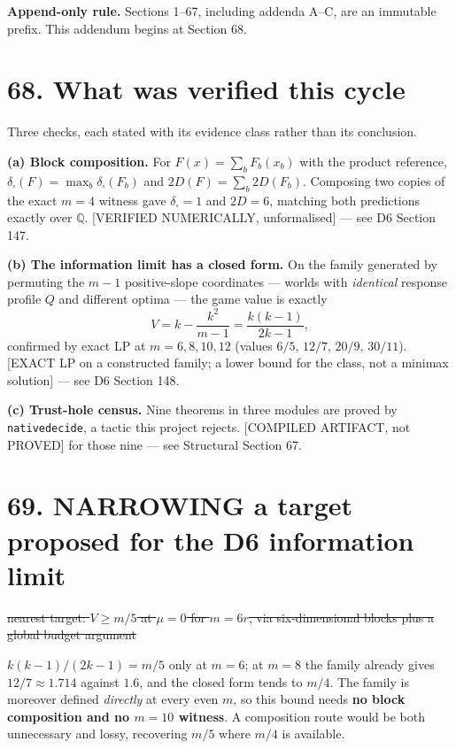 \documentclass[9pt,twocolumn]{article}
\newcommand{\oldclaim}[1]{\sout{#1}}
\newcommand{\eclass}[1]{\textsf{[#1]}}
\renewcommand{\_}{\CIGunderscore\allowbreak}
\begin{document}
\sloppy
{}
\textbf{Append-only rule.} Sections 1--67, including addenda A--C, are an immutable prefix. This addendum begins at Section 68.

\section*{68. What was verified this cycle}
Three checks, each stated with its evidence class rather than its conclusion.

\textbf{(a) Block composition.} For $F(x)=\sum_b F_b(x_b)$ with the product reference, $\delta_\square(F)=\max_b\delta_\square(F_b)$ and $2D(F)=\sum_b 2D(F_b)$. Composing two copies of the exact $m=4$ witness gave $\delta_\square=1$ and $2D=6$, matching both predictions exactly over $\mathbb{Q}$. \eclass{VERIFIED NUMERICALLY, unformalised} --- see D6 Section 147.

\textbf{(b) The information limit has a closed form.} On the family generated by permuting the $m-1$ positive-slope coordinates --- worlds with \emph{identical} response profile $Q$ and different optima --- the game value is exactly
\[V=k-\frac{k^2}{m-1}=\frac{k(k-1)}{2k-1},\]
confirmed by exact LP at $m=6,8,10,12$ (values $6/5,\,12/7,\,20/9,\,30/11$). \eclass{EXACT LP on a constructed family; a lower bound for the class, not a minimax solution} --- see D6 Section 148.

\textbf{(c) Trust-hole census.} Nine theorems in three modules are proved by \texttt{native\_decide}, a tactic this project rejects. \eclass{COMPILED ARTIFACT, not PROVED} for those nine --- see Structural Section 67.

\section*{69. NARROWING a target proposed for the D6 information limit}
\begin{center}\scriptsize\oldclaim{nearest target: $V\ge m/5$ at $\mu=0$ for $m=6r$, via six-dimensional blocks plus a global budget argument}\end{center}
$k(k-1)/(2k-1)=m/5$ only at $m=6$; at $m=8$ the family already gives $12/7\approx1.714$ against $1.6$, and the closed form tends to $m/4$. The family is moreover defined \emph{directly} at every even $m$, so this bound needs \textbf{no block composition and no $m=10$ witness}. A composition route would be both unnecessary and lossy, recovering $m/5$ where $m/4$ is available.
\end{document}
